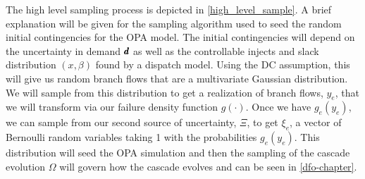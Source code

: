 The high level sampling process is depicted in  \cref{high_level_sample}. A brief explanation will be given for the sampling algorithm used to seed the random initial contingencies for the OPA model.  The initial contingencies will depend on the uncertainty in demand $\pmb{d}$ as well as the controllable injects and slack distribution $(x,\beta)$ found by a dispatch model.  Using the DC assumption, this will give us random branch flows that are a multivariate Gaussian distribution.  We will sample from this distribution to get a realization of branch flows, $y_e$, that we will transform via our failure density function $g(\cdot)$.  Once we have $g_e(y_e)$, we can sample from our second source of uncertainty, $\Xi$, to get  $\xi_e$, a vector of Bernoulli random variables taking 1 with the probabilities $g_e(y_e)$.  This distribution will seed the OPA simulation and then the sampling of the cascade evolution $\Omega$  will govern how the cascade evolves and can be seen in \cref{dfo-chapter}.

